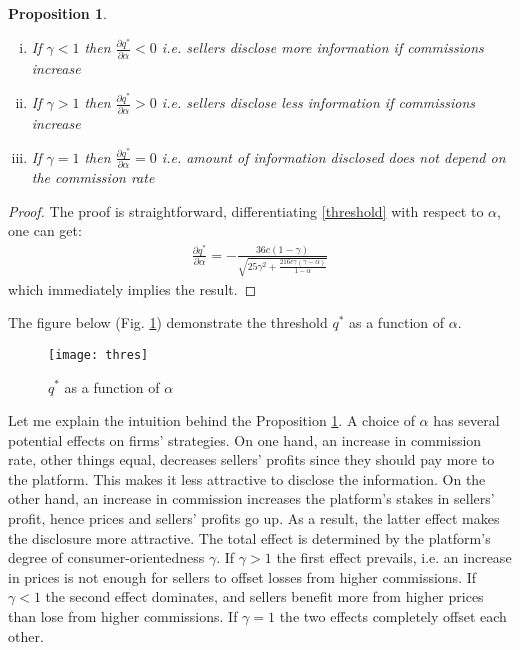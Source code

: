 \documentclass[a4paper]{article}
\newtheorem{proposition}[theorem]{Proposition}
\begin{document}
\begin{proposition}\label{thres}
	\begin{enumerate}[(i)]
		\item If $\gamma <1$ then $\frac{\partial q^*}{\partial \alpha} < 0$ i.e. sellers disclose more information if commissions increase
		\item If $\gamma > 1$ then $\frac{\partial q^*}{\partial \alpha} > 0$ i.e. sellers disclose less information if commissions increase
		\item If $\gamma = 1$ then $\frac{\partial q^*}{\partial \alpha} = 0$ i.e. amount of information disclosed does not depend on the commission rate
	\end{enumerate}
\end{proposition}
\begin{proof}
	The proof is straightforward, differentiating \eqref{threshold} with respect to $\alpha$, one can get:
	\begin{align*}
	\frac{\partial q^*}{\partial \alpha} = - \frac{36 c (1-\gamma)}{\sqrt{25 \gamma^2 + \frac{216 c \gamma (\gamma - \alpha)}{1 - \alpha}}} 
	\end{align*}
	which immediately implies the result.
\end{proof}
The figure below (Fig. \ref{fig2}) demonstrate the threshold $q^*$ as a function of $\alpha$.
	\begin{figure}[H]
	\centering
	\texttt{[image: thres]}
	\caption{$q^*$ as a function of $\alpha$}\label{fig2}
\end{figure}


Let me explain the intuition behind the Proposition \ref{thres}. A choice of $\alpha$ has several potential effects on firms' strategies. On one hand, an increase in commission rate, other things equal, decreases sellers' profits since they should pay more to the platform. This makes it less attractive to disclose the information. On the other hand, an increase in commission increases the platform's stakes in sellers' profit, hence prices and sellers' profits go up. As a result, the latter effect makes the disclosure more attractive. The total effect is determined by the platform's degree of consumer-orientedness $\gamma$. If $\gamma > 1$ the first effect prevails, i.e. an increase in prices is not enough for sellers to offset losses from higher commissions. If $\gamma < 1$ the second effect dominates, and sellers benefit more from higher prices than lose from higher commissions. If $\gamma = 1$ the two effects completely offset each other.
\end{document}
